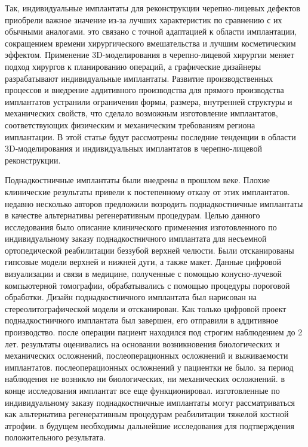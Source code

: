 Так, индивидуальные имплантаты для реконструкции черепно-лицевых дефектов приобрели
важное значение из-за лучших характеристик по сравнению с их обычными аналогами.
это связано с точной адаптацией к области имплантации, сокращением времени
хирургического вмешательства и лучшим косметическим эффектом. Применение
3D-моделирования в черепно-лицевой хирургии меняет подход хирургов к
планированию операций, а графические дизайнеры разрабатывают индивидуальные
имплантаты. Развитие производственных процессов и внедрение аддитивного
производства для прямого производства имплантатов устранили ограничения формы,
размера, внутренней структуры и механических свойств, что сделало возможным
изготовление имплантатов, соответствующих физическим и механическим требованиям
региона имплантации. В этой статье будут рассмотрены последние тенденции в
области 3D-моделирования и индивидуальных имплантатов в черепно-лицевой
реконструкции.\cite{24987592}

Поднадкостничные имплантаты были внедрены в прошлом веке. Плохие клинические
результаты привели к постепенному отказу от этих имплантатов. недавно несколько
авторов предложили возродить поднадкостничные имплантаты в качестве альтернативы
регенеративным процедурам. Целью данного исследования было описание клинического
применения изготовленного по индивидуальному заказу поднадкостничного имплантата
для несъемной ортопедической реабилитации беззубой верхней челюсти. Были
отсканированы гипсовые модели верхней и нижней дуги, а также макет. Данные
цифровой визуализации и связи в медицине, полученные с помощью конусно-лучевой
компьютерной томографии, обрабатывались с помощью процедуры пороговой обработки.
Дизайн поднадкостничного имплантата был нарисован на стереолитографической
модели и отсканирован. Как только цифровой проект поднадкостничного имплантата
был завершен, его отправили в аддитивное производство. после операции пациент
находился под строгим наблюдением до 2 лет. результаты оценивались на основании
возникновения биологических и механических осложнений, послеоперационных
осложнений и выживаемости имплантатов. послеоперационных осложнений у пациентки
не было. за период наблюдения не возникло ни биологических, ни механических
осложнений. в конце исследования имплантат все еще функционировал. изготовленные
по индивидуальному заказу поднадкостничные имплантаты могут рассматриваться как
альтернатива регенеративным процедурам реабилитации тяжелой костной атрофии. в
будущем необходимы дальнейшие исследования для подтверждения положительного
результата.\cite{36345834}

